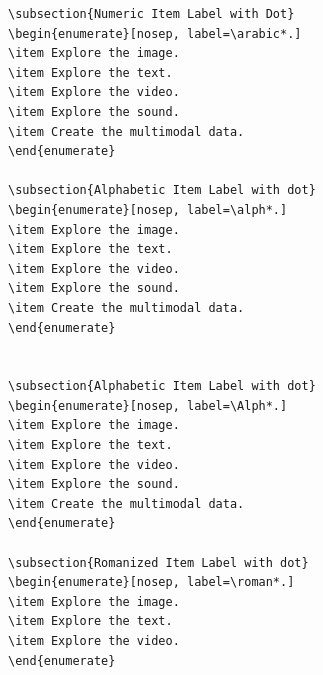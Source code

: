 \documentclass{article}
\begin{document}
\begin{lstlisting}
\subsection{Numeric Item Label with Dot}
\begin{enumerate}[nosep, label=\arabic*.]
\item Explore the image.
\item Explore the text.
\item Explore the video.
\item Explore the sound.
\item Create the multimodal data.
\end{enumerate}

\subsection{Alphabetic Item Label with dot}
\begin{enumerate}[nosep, label=\alph*.]
\item Explore the image.
\item Explore the text.
\item Explore the video.
\item Explore the sound.
\item Create the multimodal data.
\end{enumerate}


\subsection{Alphabetic Item Label with dot}
\begin{enumerate}[nosep, label=\Alph*.]
\item Explore the image.
\item Explore the text.
\item Explore the video.
\item Explore the sound.
\item Create the multimodal data.
\end{enumerate}

\subsection{Romanized Item Label with dot}
\begin{enumerate}[nosep, label=\roman*.]
\item Explore the image.
\item Explore the text.
\item Explore the video.
\end{enumerate}


\end{lstlisting}
\end{document}
